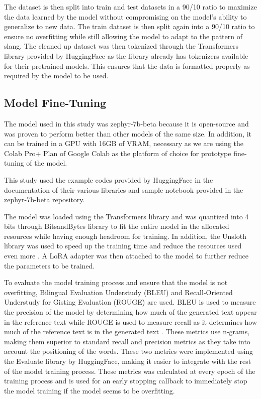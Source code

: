 The dataset is then split into train and test datasets in a 90/10 ratio to maximize the data learned by the model without compromising on the model's ability to generalize to new data. The train dataset is then split again into a 90/10 ratio to ensure no overfitting while still allowing the model to adapt to the pattern of slang. The cleaned up dataset was then tokenized through the Transformers library provided by HuggingFace as the library already has tokenizers available for their pretrained models.
This ensures that the data is formatted properly as required by the model to be used.

\subsection{Model Fine-Tuning}
The model used in this study was zephyr-7b-beta because it is open-source and was proven to perform better than other models of the same size. In addition, it can be trained in a GPU with 16GB of VRAM, necessary as we are using the Colab Pro+ Plan of Google Colab as the platform of choice for prototype fine-tuning of the model.

This study used the example codes provided by HuggingFace in the documentation of their various libraries and sample notebook provided in the zephyr-7b-beta repository. 

The model was loaded using the Transformers library and was quantized into 4 bits through BitsandBytes library to fit the entire model in the allocated resources while having enough headroom for training. In addition, the Unsloth library was used to speed up the training time and reduce the resources used even more \cite{unsloth}. A LoRA adapter was then attached to the model to further reduce the parameters to be trained.

To evaluate the model training process and ensure that the model is not overfitting, Bilingual Evaluation Understudy (BLEU) and Recall-Oriented Understudy for Gisting Evaluation (ROUGE) are used. BLEU is used to measure the precision of the model by determining how much of the generated text appear in the reference text \cite{papineni_roukos_ward_zhu_2001} while ROUGE is used to measure recall as it determines how much of the reference text is in the generated text \cite{lin_2004}. These metrics use n-grams, making them superior to standard recall and precision metrics as they take into account the positioning of the words. These two metrics were implemented using the Evaluate library by HuggingFace, making it easier to integrate with the rest of the model training process. These metrics was calculated at every epoch of the training process and is used for an early stopping callback to immediately stop the model training if the model seems to be overfitting.


